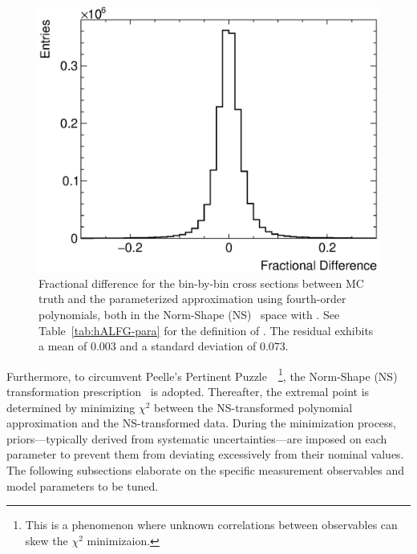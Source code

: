 \begin{figure}[!htb] 	
    \centering 		
    \includegraphics[width=\sgfigwid\textwidth]{figures/tuning/residual.eps}
    \caption{\label{fig:residual} Fractional difference for the bin-by-bin cross sections between MC truth and the parameterized approximation using fourth-order polynomials, both in the Norm-Shape (NS)~\cite{DAgostini:1993arp,Hanson:2005mrg} space with \allpar. See Table~\ref{tab:hALFG-para} for the definition of \allpar. The residual exhibits a mean of $0.003$ and a standard deviation of $0.073$.} 
\end{figure}

Furthermore, to circumvent Peelle's Pertinent Puzzle~\cite{PPP_FNL,Chakrani:2023htw}~\footnote{This is a phenomenon where unknown correlations between observables can skew the $\chi^2$ minimizaion.}, the Norm-Shape (NS) transformation prescription~\cite{DAgostini:1993arp,Hanson:2005mrg} is adopted. 
Thereafter, the extremal point is determined by minimizing $\chi^2$ between the NS-transformed polynomial approximation and the NS-transformed data. 
During the minimization process, priors—typically derived from systematic uncertainties—are imposed on each parameter to prevent them from deviating excessively from their nominal values. 
The following subsections elaborate on the specific measurement observables and model parameters to be tuned.


